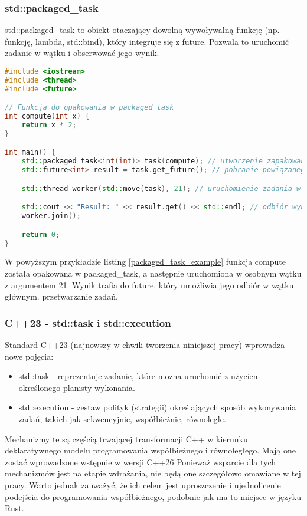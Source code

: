 \subsubsection{std::packaged\_task}
std::packaged\_task to obiekt otaczający dowolną wywoływalną funkcję (np. funkcję, lambda, std::bind), który integruje się z future. Pozwala to uruchomić zadanie w wątku i obserwować jego wynik.
\begin{lstlisting}[language=C++, caption={Przykład użycia std::packaged\_task}, label={packaged_task_example}]
#include <iostream>
#include <thread>
#include <future>

// Funkcja do opakowania w packaged_task
int compute(int x) {
    return x * 2;
}

int main() {
    std::packaged_task<int(int)> task(compute); // utworzenie zapakowanego zadania
    std::future<int> result = task.get_future(); // pobranie powiązanego future

    std::thread worker(std::move(task), 21); // uruchomienie zadania w wątku z parametrem 21

    std::cout << "Result: " << result.get() << std::endl; // odbiór wyniku
    worker.join();

    return 0;
}
\end{lstlisting}
W powyższym przykładzie listing \ref{packaged_task_example} funkcja compute została opakowana w packaged\_task, a następnie uruchomiona w osobnym wątku z argumentem 21. Wynik trafia do future, który umożliwia jego odbiór w wątku głównym. przetwarzanie zadań.

\subsubsection{C++23 - std::task i std::execution}
Standard C++23 (najnowszy w chwili tworzenia niniejszej pracy) wprowadza nowe pojęcia:
\begin{itemize}
    \item std::task - reprezentuje zadanie, które można uruchomić z użyciem określonego planisty wykonania.
    \item std::execution - zestaw polityk (strategii) określających sposób wykonywania zadań, takich jak sekwencyjnie, współbieżnie, równolegle.
\end{itemize}

Mechanizmy te są częścią trwającej transformacji C++ w kierunku deklaratywnego modelu programowania współbieżnego i równoległego. Mają one zostać wprowadzone wstępnie w wersji C++26 \cite{cpp26} Ponieważ wsparcie dla tych mechanizmów jest na etapie wdrażania, nie będą one szczegółowo omawiane w tej pracy. Warto jednak zauważyć, że ich celem jest uproszczenie i ujednolicenie podejścia do programowania współbieżnego, podobnie jak ma to miejsce w języku Rust.